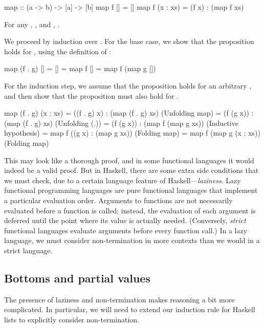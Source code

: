 \begin{hscode}
map :: (a -> b) -> [a] -> [b]
map f []       = []
map f (x : xs) = (f x) : (map f xs)
\end{hscode}

\begin{theorem}
\label{thm:map-compose}
For any , , and , .
\end{theorem}
\noindent
We proceed by induction over . For the base case, we show that the proposition holds for , using the definition of :
%
\begin{hscode}
map (f . g) [] = [] = map f [] = map f (map g [])
\end{hscode}
%
For the induction step, we assume that the proposition holds for an arbitrary , and then show that the proposition must also hold for .
%
\begin{hscode}
map (f . g) (x : xs)
  = ((f . g) x) : (map (f . g) xs)   (Unfolding map)
  = (f (g x)) : (map (f . g) xs)     (Unfolding (.))
  = (f (g x)) : (map f (map g xs))   (Inductive hypothesis)
  = map f ((g x) : (map g xs))       (Folding map)
  = map f (map g (x : xs))           (Folding map)
\end{hscode}

This may look like a thorough proof, and in some functional languages it would indeed be a valid proof. But in Haskell, there are some extra side conditions that we must check, due to a certain language feature of Haskell---\emph{laziness}. Lazy functional programming languages are pure functional languages that implement a particular evaluation order. Arguments to functions are not necessarily evaluated before a function is called; instead, the evaluation of each argument is deferred until the point where its value is actually needed. (Conversely, \emph{strict} functional languages evaluate arguments before every function call.) In a lazy language, we must consider non-termination in more contexts than we would in a strict language.

\subsection{Bottoms and partial values}

The presence of laziness and non-termination makes reasoning a bit more complicated. In particular, we will need to extend our induction rule for Haskell lists to explicitly consider non-termination.

